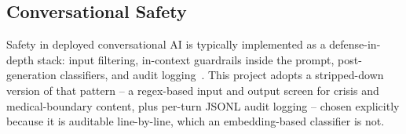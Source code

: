\subsection{Conversational Safety}

Safety in deployed conversational AI is typically implemented as a
defense-in-depth stack: input filtering, in-context guardrails inside the
prompt, post-generation classifiers, and audit logging~\cite{markov2023moderation,inan2023llamaguard}.
This project adopts a stripped-down version of that pattern -- a regex-based
input and output screen for crisis and medical-boundary content, plus per-turn
JSONL audit logging -- chosen explicitly because it is auditable line-by-line,
which an embedding-based classifier is not.
